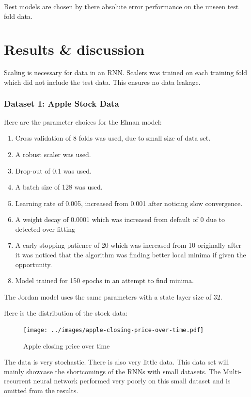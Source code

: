 \documentclass[conference]{IEEEtran}
\begin{document}
Best models are chosen by there absolute error performance on the unseen test fold data.

\section{Results \& discussion}

Scaling is necessary for data in an RNN. Scalers was trained on each training fold which did not include the test data. This ensures no data leakage.

\subsubsection{Dataset 1: Apple Stock Data}

Here are the parameter choices for the Elman model:

\begin{enumerate}[]
	\item Cross validation of 8 folds was used, due to small size of data set.
	\item A robust scaler was used.
	\item Drop-out of 0.1 was used.
	\item A batch size of 128 was used.
	\item Learning rate of 0.005, increased from 0.001 after noticing slow convergence.
	\item A weight decay of 0.0001 which was increased from default of 0 due to detected over-fitting
	\item A early stopping patience of 20 which was increased from 10 originally after it was noticed that the algorithm was finding better local minima if given the opportunity.
	\item Model trained for 150 epochs in an attempt to find minima.
\end{enumerate}

The Jordan model uses the same parameters with a state layer size of 32.

Here is the distribution of the stock data:

\begin{figure}[H] 
	\centering
	\texttt{[image: ../images/apple-closing-price-over-time.pdf]}
	\caption{Apple closing price over time}
	\label{fig:apple-closing}
\end{figure}

The data is very stochastic. There is also very little data. This data set will mainly showcase the shortcomings of the RNNs with small datasets. The Multi-recurrent neural network performed very poorly on this small dataset and is omitted from the results.
\end{document}
